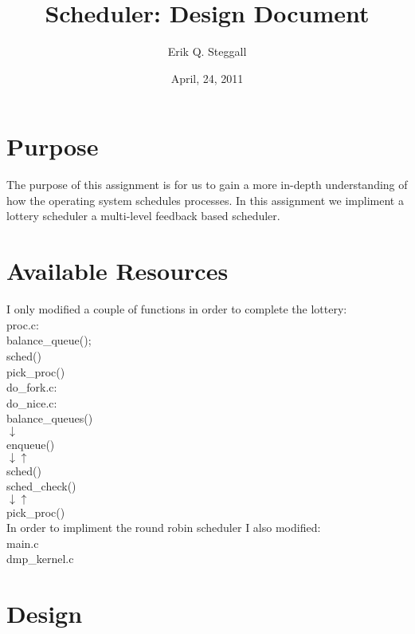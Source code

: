 \documentclass[a4paper, 12pt]{article}
\title{Scheduler: Design Document}
\date{April, 24, 2011}
\author{Erik Q. Steggall}
\begin{document}
\maketitle

\section{Purpose}

The purpose of this assignment is for us to gain a more in-depth understanding of how the operating system schedules processes. In this assignment we impliment a lottery scheduler a multi-level feedback based scheduler. \\

\section{Available Resources}
I only modified a couple of functions in order to complete the lottery: \\

\noindent
proc.c: \\
balance\_queue(); \\
sched() \\
pick\_proc() \\

\noindent
do\_fork.c: \\
do\_nice.c: \\

\noindent
balance\_queues() \\
$\downarrow $ \\
enqueue() \\
$\downarrow \uparrow$ \\
sched() \\

\noindent
sched\_check() \\
$\downarrow \uparrow $ \\
pick\_proc() \\

In order to impliment the round robin scheduler I also modified: \\

\noindent
main.c \\

\noindent
dmp\_kernel.c \\


\section{Design}
\end{document}

